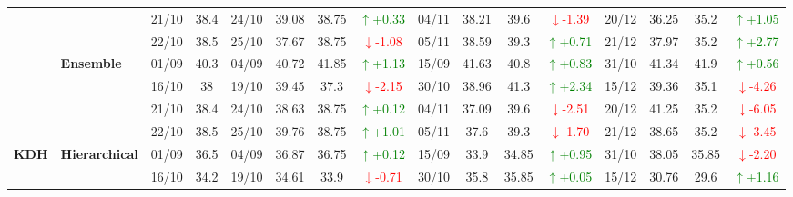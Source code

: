 {\begin{longtable}{llcc|cccc|cccc|cccc}
& 
& 21/10 & 38.4 & 24/10 & 39.08 & 38.75 & \textcolor{green}{\(\uparrow\)+0.33} & 04/11 & 38.21 & 39.6 & \textcolor{red}{\(\downarrow\)-1.39} & 20/12 & 36.25 & 35.2 & \textcolor{green}{\(\uparrow\)+1.05} \\

&
& 22/10 & 38.5 & 25/10 & 37.67 & 38.75 & \textcolor{red}{\(\downarrow\)-1.08} & 05/11 & 38.59 & 39.3 & \textcolor{green}{\(\uparrow\)+0.71} & 21/12 & 37.97 & 35.2 & \textcolor{green}{\(\uparrow\)+2.77} \\
\cmidrule(lr){2-16}


& \textbf{Ensemble}
& 01/09 & 40.3 & 04/09 & 40.72 & 41.85 & \textcolor{green}{\(\uparrow\)+1.13} & 15/09 & 41.63 & 40.8 & \textcolor{green}{\(\uparrow\)+0.83} & 31/10 & 41.34 & 41.9 & \textcolor{green}{\(\uparrow\)+0.56} \\

& 
& 16/10 & 38 & 19/10 & 39.45 & 37.3 & \textcolor{red}{\(\downarrow\)-2.15} & 30/10 & 38.96 & 41.3 & \textcolor{green}{\(\uparrow\)+2.34} & 15/12 & 39.36 & 35.1 & \textcolor{red}{\(\downarrow\)-4.26} \\

& 
& 21/10 & 38.4 & 24/10 & 38.63 & 38.75 & \textcolor{green}{\(\uparrow\)+0.12} & 04/11 & 37.09 & 39.6 & \textcolor{red}{\(\downarrow\)-2.51} & 20/12 & 41.25 & 35.2 & \textcolor{red}{\(\downarrow\)-6.05} \\

&
& 22/10 & 38.5 & 25/10 & 39.76 & 38.75 & \textcolor{green}{\(\uparrow\)+1.01} & 05/11 & 37.6 & 39.3 & \textcolor{red}{\(\downarrow\)-1.70} & 21/12 & 38.65 & 35.2 & \textcolor{red}{\(\downarrow\)-3.45} \\
\midrule



\multirow{12}{*}{\textbf{KDH}} 
& \textbf{Hierarchical}
& 01/09 & 36.5 & 04/09 & 36.87 & 36.75 & \textcolor{green}{\(\uparrow\)+0.12} & 15/09 & 33.9 & 34.85 & \textcolor{green}{\(\uparrow\)+0.95} & 31/10 & 38.05 & 35.85 & \textcolor{red}{\(\downarrow\)-2.20} \\

&
& 16/10 & 34.2 & 19/10 & 34.61 & 33.9 & \textcolor{red}{\(\downarrow\)-0.71} & 30/10 & 35.8 & 35.85 & \textcolor{green}{\(\uparrow\)+0.05} & 15/12 & 30.76 & 29.6 & \textcolor{green}{\(\uparrow\)+1.16} \\


\end{longtable}}
